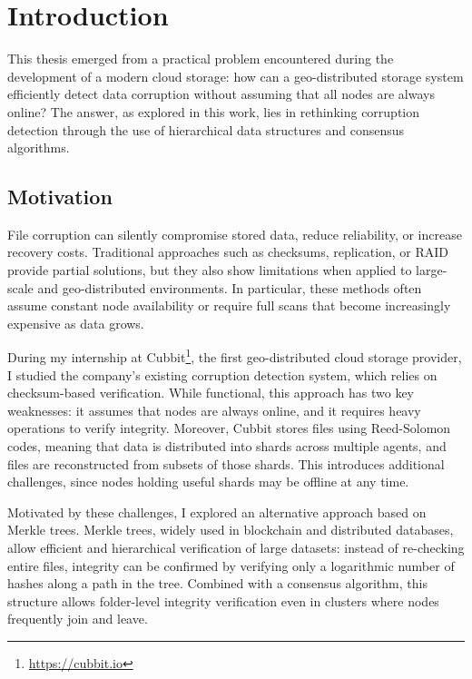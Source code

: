 \chapter{Introduction}

This thesis emerged from a practical problem encountered during the development
of a modern cloud storage: how can a geo-distributed storage system efficiently
detect data corruption without assuming that all nodes are always online? The answer, as explored in this work, lies in rethinking corruption detection through the use of hierarchical data structures and consensus algorithms.

\section{Motivation}

File corruption can silently compromise stored data, reduce reliability, or increase recovery costs. Traditional approaches such as checksums, replication, or RAID \cite{chen1994raid} provide partial solutions, but they also show limitations when applied to large-scale and geo-distributed environments. In particular, these methods often assume constant node availability or require full scans that become increasingly expensive as data grows.

During my internship at Cubbit\footnote{\url{https://cubbit.io}}, the first geo-distributed cloud storage provider, I studied the company's existing corruption detection system, which relies on checksum-based verification. While functional, this approach has two key weaknesses: it assumes that nodes are always online, and it requires heavy operations to verify integrity. Moreover, Cubbit stores files using Reed-Solomon codes, meaning that data is distributed into shards across multiple agents, and files are reconstructed from subsets of those shards. This introduces additional challenges, since nodes holding useful shards may be offline at any time.

Motivated by these challenges, I explored an alternative approach based on Merkle trees. Merkle trees, widely used in blockchain and distributed databases, allow efficient and hierarchical verification of large datasets: instead of re-checking entire files, integrity can be confirmed by verifying only a logarithmic number of hashes along a path in the tree. Combined with a consensus algorithm, this structure allows folder-level integrity verification even in clusters where nodes frequently join and leave.

